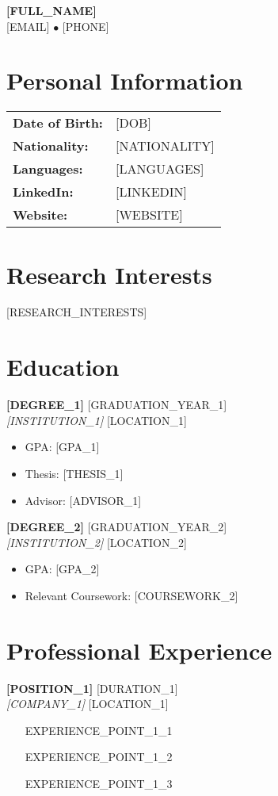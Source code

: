 \documentclass[11pt,a4paper]{article}
\newcommand{\cvheader}[4]{
    \begin{center}
        {\Large\textbf{#1}} \\
        \vspace{0.2cm}
        #2 $\bullet$ #3 \\
        #4
    \end{center}
    \vspace{0.3cm}
}
\newcommand{\cventry}[4]{
    \textbf{#1} \hfill #2 \\
    \textit{#3} \hfill #4 \\
    \vspace{0.1cm}
}
\begin{document}
\cvheader{[FULL_NAME]}{[EMAIL]}{[PHONE]}{[ADDRESS]}

\section{Personal Information}
\begin{tabular}{ll}
\textbf{Date of Birth:} & [DOB] \\
\textbf{Nationality:} & [NATIONALITY] \\
\textbf{Languages:} & [LANGUAGES] \\
\textbf{LinkedIn:} & [LINKEDIN] \\
\textbf{Website:} & [WEBSITE] \\
\end{tabular}

\section{Research Interests}
[RESEARCH_INTERESTS]

\section{Education}
\cventry{[DEGREE_1]}{[GRADUATION_YEAR_1]}{[INSTITUTION_1]}{[LOCATION_1]}
\begin{itemize}[leftmargin=0.2in]
    \item GPA: [GPA_1]
    \item Thesis: [THESIS_1]
    \item Advisor: [ADVISOR_1]
\end{itemize}

\cventry{[DEGREE_2]}{[GRADUATION_YEAR_2]}{[INSTITUTION_2]}{[LOCATION_2]}
\begin{itemize}[leftmargin=0.2in]
    \item GPA: [GPA_2]
    \item Relevant Coursework: [COURSEWORK_2]
\end{itemize}

\section{Professional Experience}
\cventry{[POSITION_1]}{[DURATION_1]}{[COMPANY_1]}{[LOCATION_1]}
\begin{itemize}[leftmargin=0.2in]
    \item [EXPERIENCE_POINT_1_1]
    \item [EXPERIENCE_POINT_1_2]
    \item [EXPERIENCE_POINT_1_3]
\end{itemize}
\end{document}
